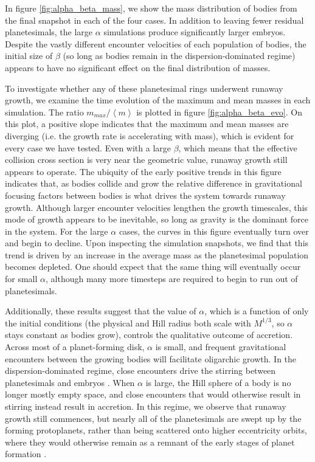 \documentclass[twocolumn]{aastex63}
\begin{document}
In figure \ref{fig:alpha_beta_mass}, we show the mass distribution of bodies from the final snapshot in each of the four cases. In addition to leaving fewer residual planetesimals, the large $\alpha$ simulations produce significantly larger embryos. Despite the vastly different encounter velocities of each population of bodies, the initial size of $\beta$ (so long as bodies remain in the dispersion-dominated regime) appears to have no significant effect on the final distribution of masses.

To investigate whether any of these planetesimal rings underwent
runaway growth, we examine the time evolution of the maximum and mean
masses in each simulation. The ratio $m_{max}/\left< m \right>$ is plotted
in figure \ref{fig:alpha_beta_evo}. On this plot, a positive slope
indicates that the maximum and mean masses are diverging (i.e.
the growth rate is accelerating with mass), which is
evident for every case we have tested. Even with a large
$\beta$, which means that the effective collision cross section is
very near the geometric value, runaway growth still appears to
operate. The ubiquity of the early positive trends in this figure indicates
that, as bodies collide and grow the
relative difference in gravitational focusing factors between bodies
is what drives the system towards runaway
growth. Although larger encounter velocities lengthen the growth
timescales, this mode of growth appears to be inevitable, so long as
gravity is the dominant force in the system. For the large $\alpha$
cases, the curves in this figure eventually turn over and begin to decline.
Upon inspecting the simulation snapshots, we find that this trend is
driven by an increase in the average mass as the planetesimal population
becomes depleted. One should expect that the same thing will eventually
occur for small $\alpha$, although many more timesteps are required to
begin to run out of planetesimals.

Additionally, these results suggest that the value of $\alpha$, which is a function of only the initial conditions (the physical and Hill radius both scale with $M^{1/3}$, so $\alpha$ stays constant as bodies grow), controls the qualitative outcome of accretion. Across most of a planet-forming disk, $\alpha$ is small, and frequent gravitational encounters between the growing bodies will facilitate oligarchic growth. In the dispersion-dominated regime, close encounters drive the stirring between planetesimals and embryos \citep{weidenschilling89, ida90}. When $\alpha$ is large, the Hill sphere of a body is no longer mostly empty space, and close encounters that would otherwise result in stirring instead result in accretion. In this regime, we observe that runaway growth still commences, but nearly all of the planetesimals are swept up by the forming protoplanets, rather than being scattered onto higher eccentricity orbits, where they would otherwise remain as a remnant of the early stages of planet formation \citep{kokubo98, kokubo00}.
\end{document}
